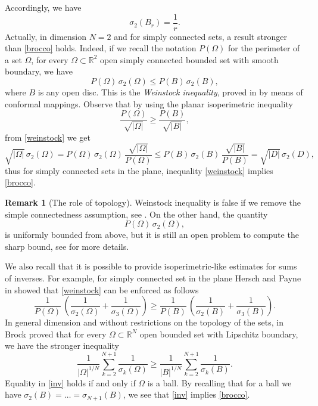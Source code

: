 \documentclass{amsart}
\theoremstyle{definition}
\newtheorem{remark}[lemma]{Remark}
\numberwithin{equation}{section}
\begin{document}
Accordingly, we have
\[
\sigma_2(B_r)=\frac{1}{r}.
\]
Actually, in dimension $N=2$ and for simply connected sets, a result stronger than \eqref{brocco} holds. Indeed, if we recall the notation $P(\Omega)$ for the perimeter of a set $\Omega$, for every $\Omega\subset\mathbb{R}^2$ open simply connected bounded set with smooth boundary, we have
\begin{equation}
\label{weinstock}
P(\Omega)\,\sigma_2(\Omega)\le P(B)\,\sigma_2(B),
\end{equation}
where $B$ is any open disc.
This is the {\it Weinstock inequality}, proved in \cite{MR0064989} by means of conformal mappings. Observe that by using the planar isoperimetric inequality
\[
\frac{P(\Omega)}{\sqrt{|\Omega|}}\ge \frac{P(B)}{\sqrt{|B|}},
\]
from \eqref{weinstock} we get
\[
\sqrt{|\Omega|}\,\sigma_2(\Omega)=P(\Omega)\,\sigma_2(\Omega)\,\frac{\sqrt{|\Omega|}}{P(\Omega)}\le P(B)\,\sigma_2(B)\,\frac{\sqrt{|B|}}{P(B)}=\sqrt{|D|}\,\sigma_2(D),
\]
thus for simply connected sets in the plane, inequality \eqref{weinstock} implies \eqref{brocco}. \begin{remark}[The role of topology]
Weinstock inequality is false if we remove the simple connectedness assumption, see \cite[Example 4.2.5]{GP}. On the other hand, the quantity 
\[
P(\Omega)\,\sigma_2(\Omega),
\]
is uniformly bounded from above, but it is still an open problem to compute the sharp bound, see \cite{GP} for more details.
\end{remark}
We also recall that it is possible to provide isoperimetric-like estimates for sums of inverses. For example, for simply connected set in the plane Hersch and Payne in \cite{MR0243210} showed that \eqref{weinstock} can be enforced as follows
\[
\frac{1}{P(\Omega)}\,\left(\frac{1}{\sigma_2(\Omega)}+\frac{1}{\sigma_3(\Omega)}\right)\ge \frac{1}{P(B)}\,\left(\frac{1}{\sigma_2(B)}+\frac{1}{\sigma_3(B)}\right).
\]
In general dimension and without restrictions on the topology of the sets, in \cite{MR1808500} Brock proved that for every $\Omega\subset\mathbb{R}^N$ open bounded set with Lipschitz boundary, we have the stronger inequality
\begin{equation}
\label{inv}
\frac{1}{|\Omega|^{1/N}}\sum\limits_{k=2}^{N+1} \frac{1}{\sigma_k(\Omega)}\ge \frac{1}{|B|^{1/N}}\sum\limits_{k=2}^{N+1} \frac{1}{\sigma_k(B)}.
\end{equation}
Equality in \eqref{inv} holds if and only if $\Omega$ is a ball. By recalling that for a ball we have $\sigma_2(B)=\dots=\sigma_{N+1}(B)$, we see that \eqref{inv} implies \eqref{brocco}.
\end{document}
